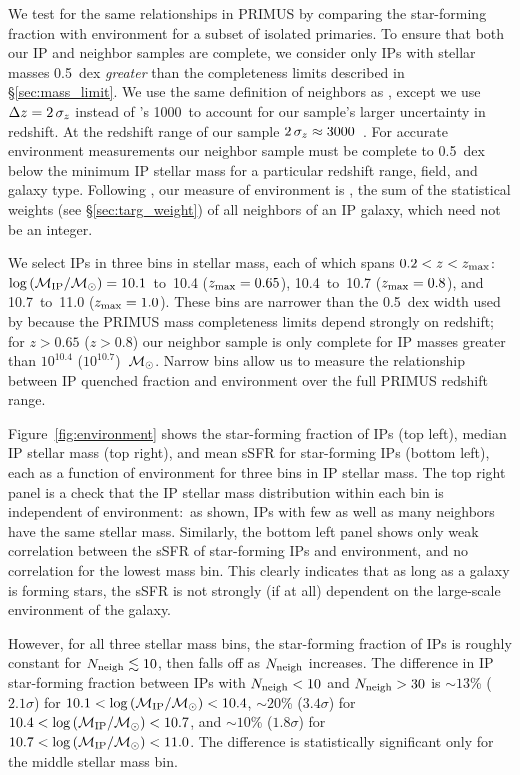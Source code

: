 We test for the same relationships in PRIMUS by comparing the star-forming fraction with environment for a subset of isolated primaries.
To ensure that both our IP and neighbor samples are complete, we consider only IPs with stellar masses 0.5~dex \emph{greater} than the completeness limits described in \S\ref{sec:mass_limit}.
We use the same definition of neighbors as \citePB, except we use ${\Delta z = 2\,\sigmaz}$ instead of \citePB's 1000~\kms to account for our sample's larger uncertainty in redshift.
At the redshift range of our sample ${2\,\sigmaz \approx 3000}$~\kms.
For accurate environment measurements our neighbor sample must be complete to 0.5~dex below the minimum IP stellar mass for a particular redshift range, field, and galaxy type.
Following \citePB, our measure of environment is \Nneigh, the sum of the statistical weights (see \S\ref{sec:targ_weight}) of all neighbors of an IP galaxy, which need not be an integer.

We select IPs in three bins in stellar mass, each of which spans ${0.2<z<z_{\text{max}}}$:~${\log\,(\mIP/\msun)=10.1}$~to~10.4 (${z_{\text{max}}=0.65}$), 10.4~to~10.7 (${z_{\text{max}}=0.8}$), and 10.7~to~11.0 (${z_{\text{max}}=1.0}$).
These bins are narrower than the 0.5~dex width used by \citePB because the PRIMUS mass completeness limits depend strongly on redshift; for $z>0.65$ {($z>0.8$)} our neighbor sample is only complete for IP masses greater than $10^{10.4}$ ($10^{10.7}$)~$\msun$.
Narrow bins allow us to measure the relationship between IP quenched fraction and environment over the full PRIMUS redshift range.

Figure~\ref{fig:environment} shows the star-forming fraction of IPs (top left), median IP stellar mass (top right), and mean sSFR for star-forming IPs (bottom left), each as a function of environment for three bins in IP stellar mass.
The top right panel is a check that the IP stellar mass distribution within each bin is independent of environment:~as shown, IPs with few as well as many neighbors have the same stellar mass.
Similarly, the bottom left panel shows only weak correlation between the sSFR of star-forming IPs and environment, and no correlation for the lowest mass bin.  This clearly indicates that as long as a galaxy is forming stars, the sSFR is not strongly (if at all) dependent on the large-scale environment of the galaxy.

However, for all three stellar mass bins, the star-forming fraction of IPs is roughly constant for ${\Nneigh\lesssim10}$, then falls off as $\Nneigh$ increases.
The difference in IP star-forming fraction between IPs with ${\Nneigh<10}$ and ${\Nneigh>30}$ is
$\sim13$\% ($2.1\sigma$) for $10.1<\log\,(\mIP/\msun)<10.4$,
$\sim20$\% ($3.4\sigma$) for $10.4<\log\,(\mIP/\msun)<10.7$, and
$\sim10$\% ($1.8\sigma$) for $10.7<\log\,(\mIP/\msun)<11.0$.
The difference is statistically significant only for the middle stellar mass bin.

